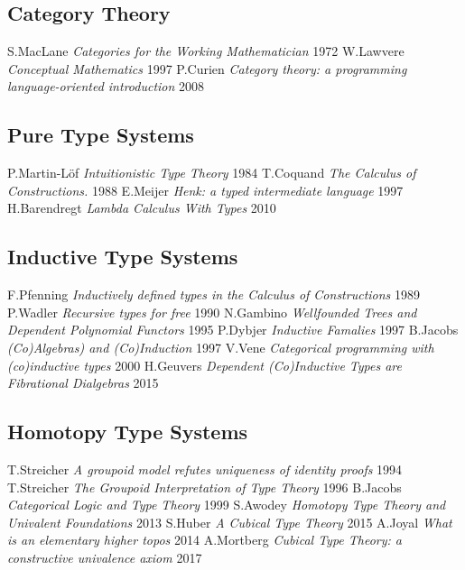 \documentclass[11pt,oneside]{article}
\begin{document}
\newpage
\begin{thebibliography}{9}

\subsection*{Category Theory}
    S.MacLane \textit{Categories for the Working Mathematician} 1972
    W.Lawvere \textit{Conceptual Mathematics} 1997
     P.Curien \textit{Category theory: a programming language-oriented introduction} 2008

\subsection*{Pure Type Systems}
  P.Martin-Löf \textit{Intuitionistic Type Theory} 1984
    T.Coquand \textit{The Calculus of Constructions.} 1988
       E.Meijer \textit{Henk: a typed intermediate language} 1997
 H.Barendregt \textit{Lambda Calculus With Types} 2010

\subsection*{Inductive Type Systems}
   F.Pfenning \textit{Inductively defined types in the Calculus of Constructions} 1989
     P.Wadler \textit{Recursive types for free} 1990
    N.Gambino \textit{Wellfounded Trees and Dependent Polynomial Functors} 1995
     P.Dybjer \textit{Inductive Famalies} 1997
     B.Jacobs \textit{(Co)Algebras) and (Co)Induction} 1997
       V.Vene \textit{Categorical programming with (co)inductive types} 2000
    H.Geuvers \textit{Dependent (Co)Inductive Types are Fibrational Dialgebras} 2015


\subsection*{Homotopy Type Systems}
 T.Streicher \textit{A groupoid model refutes uniqueness of identity proofs} 1994
  T.Streicher \textit{The Groupoid Interpretation of Type Theory} 1996
    B.Jacobs \textit{Categorical Logic and Type Theory} 1999
     S.Awodey \textit{Homotopy Type Theory and Univalent Foundations} 2013
      S.Huber \textit{A Cubical Type Theory} 2015
      A.Joyal \textit{What is an elementary higher topos} 2014
   A.Mortberg \textit{Cubical Type Theory: a constructive univalence axiom} 2017

\end{thebibliography}
\newpage
\end{document}
